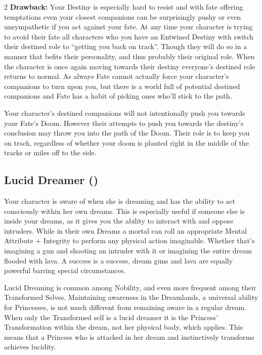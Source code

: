 \begin{multicols}{2}
\textbf{Drawback:} Your Destiny is especially hard to resist and with fate offering temptations even your closest companions can be surprisingly pushy or even unsympathetic if you act against your fate. At any time your character is trying to avoid their fate all characters who you have an Entwined Destiny with switch their destined role to \textquotedblleft getting you back on track\textquotedblright. Though they will do so in a manner that befits their personality, and thus probably their original role. When the character is once again moving towards their destiny everyone's destined role returns to normal. As always Fate cannot actually force your character's companions to turn upon you, but there is a world full of potential destined companions and Fate has a habit of picking ones who'll stick to the path.

Your character's destined companions will not intentionally push you towards your Fate's Doom. However their attempts to push you towards the destiny's conclusion may throw you into the path of the Doom. Their role is to keep you on track, regardless of whether your doom is planted right in the middle of the tracks or miles off to the side. 


\subsection*{Lucid Dreamer (\textbullet\textbullet)}

Your character is aware of when she is dreaming and has the ability to act consciously within her own dreams. This is especially useful if someone else is inside your dreams, as it gives you the ability to interact with and oppose intruders. While in their own Dreams a mortal can roll an appropriate Mental Attribute + Integrity to perform any physical action imaginable. Whether that's imagining a gun and shooting an intruder with it or imagining the entire dream flooded with lava. A success is a success, dream guns and lava are equally powerful barring special circumstances. 

Lucid Dreaming is common among Nobility, and even more frequent among their Transformed Selves. Maintaining awareness in the Dreamlands, a universal ability for Princesses, is not much different from remaining aware in a regular dream. When only the Transformed self is a lucid dreamer it is the Princess' Transformation within the dream, not her physical body, which applies. This means that a Princess who is attacked in her dream and instinctively transforms achieves lucidity. 


\end{multicols}
